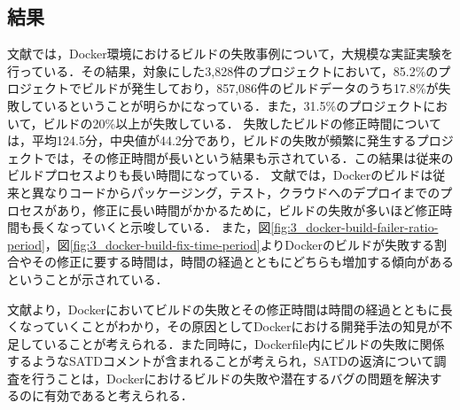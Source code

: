 \subsection{結果}
文献\cite{docker-failures}では，Docker環境におけるビルドの失敗事例について，大規模な実証実験を行っている．その結果，対象にした3,828件のプロジェクトにおいて，85.2\%のプロジェクトでビルドが発生しており，857,086件のビルドデータのうち17.8\%が失敗しているということが明らかになっている．また，31.5\%のプロジェクトにおいて，ビルドの20\%以上が失敗している．
失敗したビルドの修正時間については，平均124.5分，中央値が44.2分であり，ビルドの失敗が頻繁に発生するプロジェクトでは，その修正時間が長いという結果も示されている．この結果は従来のビルドプロセスよりも長い時間になっている．
文献\cite{docker-failures}では，Dockerのビルドは従来と異なりコードからパッケージング，テスト，クラウドへのデプロイまでのプロセスがあり，修正に長い時間がかかるために，ビルドの失敗が多いほど修正時間も長くなっていくと示唆している．
また，図\ref{fig:3_docker-build-failer-ratio-period}，図\ref{fig:3_docker-build-fix-time-period}よりDockerのビルドが失敗する割合やその修正に要する時間は，時間の経過とともにどちらも増加する傾向があるということが示されている．


文献\cite{docker-failures}より，Dockerにおいてビルドの失敗とその修正時間は時間の経過とともに長くなっていくことがわかり，その原因としてDockerにおける開発手法の知見が不足していることが考えられる．また同時に，Dockerfile内にビルドの失敗に関係するようなSATDコメントが含まれることが考えられ，SATDの返済について調査を行うことは，Dockerにおけるビルドの失敗や潜在するバグの問題を解決するのに有効であると考えられる．